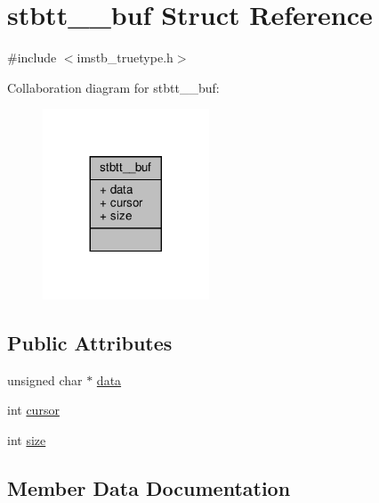 \hypertarget{structstbtt____buf}{}\section{stbtt\+\_\+\+\_\+buf Struct Reference}
\label{structstbtt____buf}


{\ttfamily \#include $<$imstb\+\_\+truetype.\+h$>$}



Collaboration diagram for stbtt\+\_\+\+\_\+buf\+:
\nopagebreak
\begin{figure}[H]
\begin{center}
\leavevmode
\includegraphics[width=140pt]{structstbtt____buf__coll__graph}
\end{center}
\end{figure}
\subsection*{Public Attributes}
\begin{DoxyCompactItemize}
\item 
unsigned char $\ast$ \hyperlink{structstbtt____buf_a376d8cdacbc8295a7e88567ad52a0ac4}{data}
\item 
int \hyperlink{structstbtt____buf_ac047fda650726920531272c28aa354fb}{cursor}
\item 
int \hyperlink{structstbtt____buf_a0f6f2d06981ab4a5697233bbd0cafb5b}{size}
\end{DoxyCompactItemize}


\subsection{Member Data Documentation}
\mbox{\label{structstbtt____buf_ac047fda650726920531272c28aa354fb}} 
